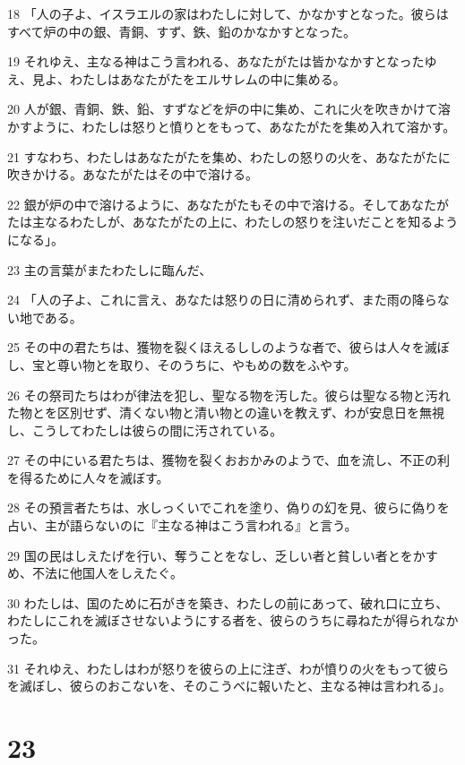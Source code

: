\par 18 「人の子よ、イスラエルの家はわたしに対して、かなかすとなった。彼らはすべて炉の中の銀、青銅、すず、鉄、鉛のかなかすとなった。
\par 19 それゆえ、主なる神はこう言われる、あなたがたは皆かなかすとなったゆえ、見よ、わたしはあなたがたをエルサレムの中に集める。
\par 20 人が銀、青銅、鉄、鉛、すずなどを炉の中に集め、これに火を吹きかけて溶かすように、わたしは怒りと憤りとをもって、あなたがたを集め入れて溶かす。
\par 21 すなわち、わたしはあなたがたを集め、わたしの怒りの火を、あなたがたに吹きかける。あなたがたはその中で溶ける。
\par 22 銀が炉の中で溶けるように、あなたがたもその中で溶ける。そしてあなたがたは主なるわたしが、あなたがたの上に、わたしの怒りを注いだことを知るようになる」。
\par 23 主の言葉がまたわたしに臨んだ、
\par 24 「人の子よ、これに言え、あなたは怒りの日に清められず、また雨の降らない地である。
\par 25 その中の君たちは、獲物を裂くほえるししのような者で、彼らは人々を滅ぼし、宝と尊い物とを取り、そのうちに、やもめの数をふやす。
\par 26 その祭司たちはわが律法を犯し、聖なる物を汚した。彼らは聖なる物と汚れた物とを区別せず、清くない物と清い物との違いを教えず、わが安息日を無視し、こうしてわたしは彼らの間に汚されている。
\par 27 その中にいる君たちは、獲物を裂くおおかみのようで、血を流し、不正の利を得るために人々を滅ぼす。
\par 28 その預言者たちは、水しっくいでこれを塗り、偽りの幻を見、彼らに偽りを占い、主が語らないのに『主なる神はこう言われる』と言う。
\par 29 国の民はしえたげを行い、奪うことをなし、乏しい者と貧しい者とをかすめ、不法に他国人をしえたぐ。
\par 30 わたしは、国のために石がきを築き、わたしの前にあって、破れ口に立ち、わたしにこれを滅ぼさせないようにする者を、彼らのうちに尋ねたが得られなかった。
\par 31 それゆえ、わたしはわが怒りを彼らの上に注ぎ、わが憤りの火をもって彼らを滅ぼし、彼らのおこないを、そのこうべに報いたと、主なる神は言われる」。

\chapter{23}

